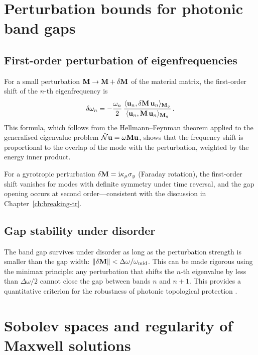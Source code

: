 \section{Perturbation bounds for photonic band gaps}
\label{sec:appA-perturbation-gaps}

\subsection{First-order perturbation of eigenfrequencies}
\label{sec:appA-first-order-pert}

For a small perturbation $\mathbf{M}\to\mathbf{M}+\delta\mathbf{M}$ of the material
matrix, the first-order shift of the $n$-th eigenfrequency is
\begin{equation}\label{eq:appA-first-order-shift}
  \delta\omega_n = -\frac{\omega_n}{2}\,
  \frac{\langle \mathbf{u}_n , \delta\mathbf{M}\,\mathbf{u}_n \rangle_{\mathbf{M}_g}}
  {\langle \mathbf{u}_n , \mathbf{M}\,\mathbf{u}_n \rangle_{\mathbf{M}_g}}\,.
\end{equation}
This formula, which follows from the Hellmann--Feynman theorem applied
to the generalised eigenvalue problem
$\hat{\mathcal{N}}\mathbf{u}=\omega\mathbf{M}\mathbf{u}$, shows that the frequency
shift is proportional to the overlap of the mode with the perturbation,
weighted by the energy inner product.

For a gyrotropic perturbation $\delta\mathbf{M}=\mathrm{i}\kappa_\mu\sigma_y$
(Faraday rotation), the first-order shift vanishes for modes with
definite symmetry under time reversal, and the gap opening occurs at
second order---consistent with the discussion in
Chapter~\ref{ch:breaking-tr}.

\subsection{Gap stability under disorder}
\label{sec:appA-gap-stability}

The band gap survives under disorder as long as the perturbation
strength is smaller than the gap width:
$\|\delta\mathbf{M}\|<\Delta\omega/\omega_{\mathrm{mid}}$.  This can be
made rigorous using the minimax principle: any perturbation that
shifts the $n$-th eigenvalue by less than $\Delta\omega/2$ cannot
close the gap between bands $n$ and $n+1$.  This provides a
quantitative criterion for the robustness of photonic topological
protection \cite{price2022roadmap}.


\section{Sobolev spaces and regularity of Maxwell solutions}
\label{sec:appA-sobolev-regularity}

